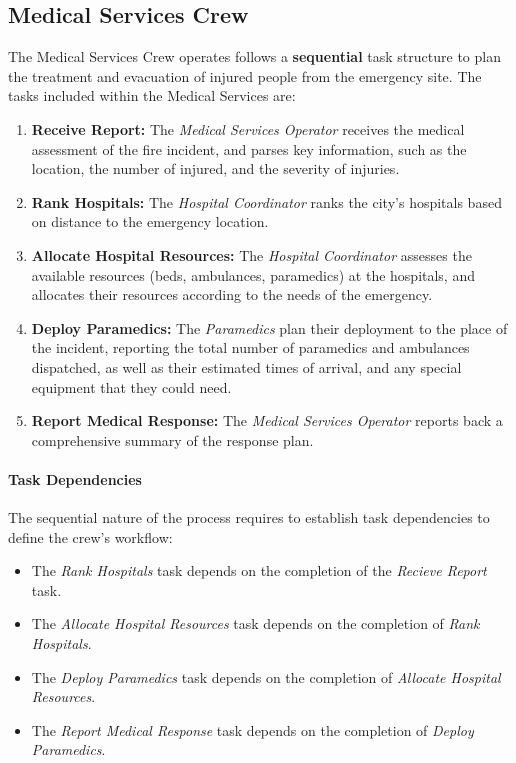 \subsection{Medical Services Crew}

The Medical Services Crew operates follows a \textbf{sequential} task structure to plan the treatment and evacuation of injured people from the emergency site. The tasks included within the Medical Services are:

\begin{enumerate}
	\item \textbf{Receive Report:} The \textit{Medical Services Operator} receives the medical assessment of the fire incident, and parses key information, such as the location, the number of injured, and the severity of injuries.
	
	\item \textbf{Rank Hospitals:} The \textit{Hospital Coordinator} ranks the city's hospitals based on distance to the emergency location.

	\item \textbf{Allocate Hospital Resources:} The \textit{Hospital Coordinator} assesses the available resources (beds, ambulances, paramedics) at the hospitals, and allocates their resources according to the needs of the emergency.
	
	\item \textbf{Deploy Paramedics:} The \textit{Paramedics} plan their deployment to the place of the incident, reporting the total number of paramedics and ambulances dispatched, as well as their estimated times of arrival, and any special equipment that they could need.
	
	\item \textbf{Report Medical Response:} The \textit{Medical Services Operator} reports back a comprehensive summary of the response plan.
\end{enumerate}

\paragraph{Task Dependencies}
The sequential nature of the process requires to establish task dependencies to define the crew's workflow:
\begin{itemize}
	\item The \textit{Rank Hospitals} task depends on the completion of the \textit{Recieve Report} task.
	\item The \textit{Allocate Hospital Resources} task depends on the completion of \textit{Rank Hospitals}.
	\item The \textit{Deploy Paramedics} task depends on the completion of \textit{Allocate Hospital Resources}.
	\item The \textit{Report Medical Response} task depends on the completion of \textit{Deploy Paramedics}.
\end{itemize}

